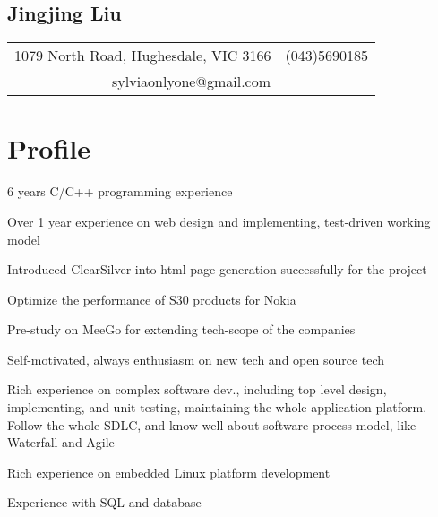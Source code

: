\documentclass[a4paper,11pt]{article}
\begin{document}
\begin{comment}
This is cover letter field.
\end{comment}


\begin{center}
  \section*{Jingjing Liu}
  \begin{tabular}{l r}
    1079 North Road, Hughesdale, VIC 3166 & (043)5690185 \\
    \multicolumn{2}{c}{sylviaonlyone@gmail.com} \\
  \end{tabular}
\end{center}

\begin{comment}
\begin{tabular}{l l}
  Mobile:  & 0435690185 \\
  E-mail:  & sylviaonlyone@gmail.com \\
  Address: & Hughesdale, VIC 3166 \\
  \multicolumn{2}{l}{Australia Permanent Resident, 175 visa holder} \\
\end{tabular}
\end{comment}

\section*{Profile}
\begin{itemize*}
    \setlength\itemsep{0.4em}
  \item 6 years C/C++ programming experience
  \item Over 1 year experience on web design and implementing, test-driven working model
  \item Introduced ClearSilver into html page generation successfully for the project
  \item Optimize the performance of S30 products for Nokia
  \item Pre-study on MeeGo for extending tech-scope of the companies
  \item Self-motivated, always enthusiasm on new tech and open source tech
  \item Rich experience on complex software dev., including top level design, implementing, and unit testing, maintaining the whole application platform. Follow the whole SDLC, and know well about software process model, like Waterfall and Agile
  \item Rich experience on embedded Linux platform development
  \item Experience with SQL and database
\end{itemize*}
\end{document}
